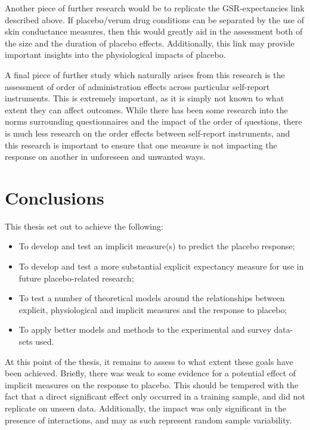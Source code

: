 Another piece of further research would be to replicate the
GSR-expectancies link described above. If placebo/verum drug
conditions can be separated by the use of skin conductance measures,
then this would greatly aid in the assessment both of the size and the
duration of placebo effects. Additionally, this link may provide
important insights into the physiological impacts of placebo.

A final piece of further study which naturally arises from this
research is the assessment of order of administration effects across
particular self-report instruments. This is extremely important, as it
is simply not known to what extent they can affect outcomes. While
there has been some research into the norms surrounding questionnaires
and the impact of the order of questions, there is much less research
on the order effects between self-report instruments, and this
research is important to ensure that one measure is not impacting the
response on another in unforeseen and unwanted ways.


\section{Conclusions}
\label{sec:concl-furth-rese}


This thesis set out to achieve the following:

\begin{itemize}
\item To develop and test an implicit measure(s) to predict the
placebo response;
\item To develop and test a more substantial explicit expectancy
measure for use in future placebo-related research;
\item To test a number of theoretical models around the relationships
between explicit, physiological and implicit measures and the response
to placebo;
\item To apply better models and methods to the experimental and
survey data-sets used.
\end{itemize}

At this point of the thesis, it remains to assess to what extent these
goals have been achieved. Briefly, there was weak to some evidence for
a potential effect of implicit measures on the response to placebo.
This should be tempered with the fact that a direct significant effect
only occurred in a training sample, and did not replicate on unseen
data. Additionally, the impact was only significant in the presence of
interactions, and may as such represent random sample variability.

